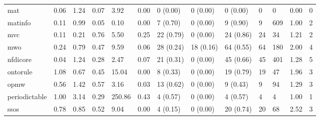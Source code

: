 \begin{table}
\begin{tabular}{m{3.5cm}m{2cm}m{2cm}m{2cm}m{2cm}m{2cm}m{2cm}m{2cm}m{2cm}m{2cm}m{2cm}m{2cm}m{2cm}}
mat                         &                0.06 &                  1.24 &                   0.07 &               3.92 &               0.00 &             0 (0.00) &   0 (0.00) &    0 (0.00) &    0 &               0 &     0.00 &          0 \\
matinfo                     &                0.11 &                  0.99 &                   0.05 &               0.10 &               0.00 &             7 (0.70) &   0 (0.00) &    9 (0.90) &    9 &             609 &     1.00 &          2 \\
mvc                         &                0.11 &                  0.21 &                   0.76 &               5.50 &               0.25 &            22 (0.79) &   0 (0.00) &   24 (0.86) &   24 &              34 &     1.21 &          2 \\
mwo                         &                0.24 &                  0.79 &                   0.47 &               9.59 &               0.06 &            28 (0.24) &  18 (0.16) &   64 (0.55) &   64 &             180 &     2.00 &          4 \\
nfdicore                    &                0.04 &                  1.24 &                   0.28 &               2.47 &               0.07 &            21 (0.31) &   0 (0.00) &   45 (0.66) &   45 &             401 &     1.28 &          5 \\
ontorule                    &                1.08 &                  0.67 &                   0.45 &              15.04 &               0.00 &             8 (0.33) &   0 (0.00) &   19 (0.79) &   19 &              47 &     1.96 &          3 \\
opmw                        &                0.56 &                  1.42 &                   0.57 &               3.16 &               0.03 &            13 (0.62) &   0 (0.00) &    9 (0.43) &    9 &              94 &     1.29 &          3 \\
periodictable               &                1.00 &                  3.14 &                   0.29 &             250.86 &               0.43 &             4 (0.57) &   0 (0.00) &    4 (0.57) &    4 &               4 &     1.00 &          1 \\
ssos                        &                0.78 &                  0.85 &                   0.52 &               9.04 &               0.00 &             4 (0.15) &   0 (0.00) &   20 (0.74) &   20 &              68 &     2.52 &          3 \\
\bottomrule
\end{tabular}
\end{table}
